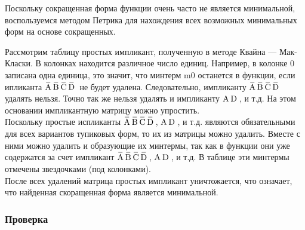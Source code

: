 \documentclass[a4paper, 14pt]{extarticle}
\begin{document}
Поскольку сокращенная форма функции очень часто не является минимальной, воспользуемся
методом Петрика для нахождения всех возможных минимальных форм на основе сокращенных.\\

\vspace{10pt}

Рассмотрим таблицу простых импликант, полученную в методе Квайна — Мак-Класки.
В колонках находится различное число единиц. Например, в колонке 0 записана одна единица,
это значит, что минтерм m0 останется в функции, если ипликанта $\OV{A}\OV{B}\OV{C}\OV{D}$ 
не будет удалена. Следовательно, импликанту $\OV{A}\OV{B}\OV{C}\OV{D}$ удалять нельзя. 
Точно так же нельзя удалять и импликанту $\text{A} \hspace{2pt}\text{D} \hspace{2pt}$, и т.д. На этом основании импликантную
матрицу можно упростить.\\

Поскольку простые испликанты $\OV{A}\OV{B}\OV{C}\OV{D}$, $\text{A} \hspace{2pt}\text{D} \hspace{2pt}$, и т.д. являются
обязательными для всех вариантов тупиковых форм, то их из матрицы можно удалить. Вместе
с ними можно удалить и образующие их минтермы, так как в функции они уже содержатся за счет
импликант $\OV{A}\OV{B}\OV{C}\OV{D}$, $\text{A} \hspace{2pt}\text{D} \hspace{2pt}$, и т.д. В таблице эти
минтермы отмечены звездочками (под колонками).\\

После всех удалений матрица простых импликант уничтожается, что означает, что найденная
скоращенная форма является минимальной.\\ 

\newpage

\subsubsection{Проверка}
\end{document}
